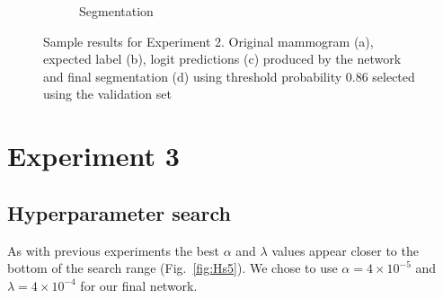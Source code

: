 \begin{figure}[h]
\begin{subfigure}{0.2\textwidth}
		\caption{Segmentation}
	\end{subfigure}%
	\caption[Qualitative results for Experiment 2]{Sample results for Experiment 2. Original mammogram (a), expected label (b), logit predictions (c) produced by the network and final segmentation (d) using threshold probability 0.86 selected using the validation set}
	\label{fig:qualitative2}
\end{figure}		



\section{Experiment 3}
\subsection{Hyperparameter search}
As with previous experiments the best $\alpha$ and $\lambda$ values appear closer to the bottom of the search range (Fig.~\ref{fig:Hs5}). We chose to use $\alpha = 4 \times 10^{-5}$ and $\lambda = 4 \times 10^{-4}$ for our final network.
